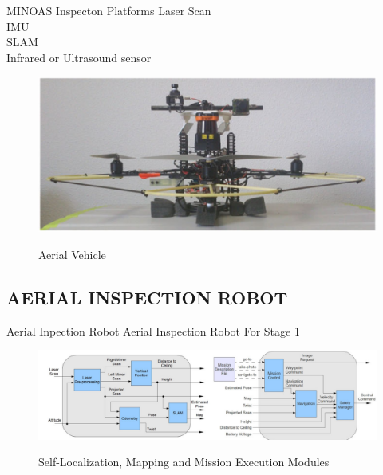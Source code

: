 \documentclass{beamer}
\begin{document}
            \begin{frame}{MINOAS Inspecton Platforms}
                    Laser Scan \\
                    IMU \\
                    SLAM \\
                    Infrared or Ultrasound sensor \\                   
                    \begin{figure}[htb]
                        \centering
                        \includegraphics[scale=0.19]{figuras/platform_overview.png}                   
                        \label{}
                        \caption{Aerial Vehicle}
                    \end{figure}
            \end{frame}

        \subsection{AERIAL INSPECTION ROBOT}

            \begin{frame}{Aerial Inpection Robot}
                \centering
                Aerial Inspection Robot For Stage 1                
                    \begin{figure}[htb]
                        \centering
                        \includegraphics[scale=0.24]{figuras/self-localization.png}                   
                        \label{}
                        \caption{Self-Localization, Mapping and Mission Execution Modules}
                    \end{figure} 
            \end{frame}
\end{document}
